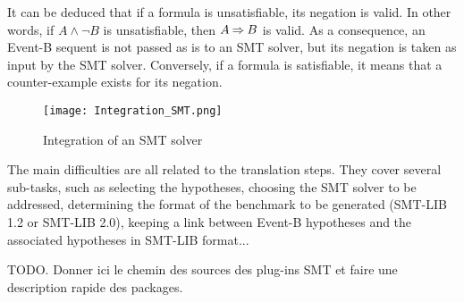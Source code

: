 It can be deduced that if a formula is unsatisfiable, its negation is valid. In other words, if $A \land \lnot B$ is unsatisfiable, then $A \mathbin\Rightarrow B$ is valid. As a consequence, an Event-B sequent is not passed as is to an SMT solver, but its negation is taken as input by the SMT solver.
Conversely, if a formula is satisfiable, it means that a counter-example exists for its negation.

\begin{figure}
\centering
\texttt{[image: Integration\_SMT.png]}
\caption{Integration of an SMT solver} 
\label{Fig:SMT solver}
\end{figure}

The main difficulties are all related to the translation steps. They cover several sub-tasks, such as selecting the hypotheses, choosing the SMT solver to be addressed, determining the format of the benchmark to be generated (SMT-LIB 1.2 or SMT-LIB 2.0), keeping a link between Event-B hypotheses and the associated hypotheses in SMT-LIB format...

TODO. Donner ici le chemin des sources des plug-ins SMT et faire une description rapide des packages.